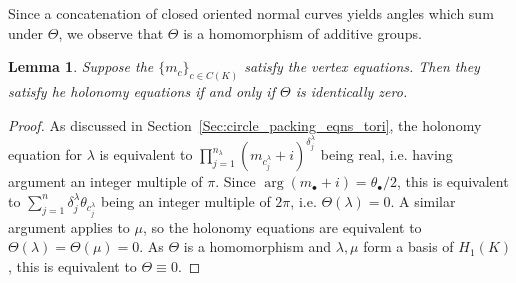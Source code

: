 \documentclass[12pt]{amsart}
\numberwithin{equation}{section}
\newtheorem{lem}[equation]{Lemma}
\theoremstyle{named}
\newcommand{\refsec}[1]{Section~\ref{Sec:#1}}
\begin{document}
Since a concatenation of closed oriented normal curves yields angles which sum under $\Theta$, we observe that $\Theta$ is a homomorphism of additive groups. 

\begin{lem}
\label{Lem:holonomy_Theta_0}
Suppose the $\{m_c\}_{c \in C(K)}$ satisfy the vertex equations. Then they satisfy he holonomy equations if and only if $\Theta$ is identically zero.
\end{lem}

\begin{proof}
As discussed in \refsec{circle_packing_eqns_tori}, the holonomy equation for $\lambda$ is equivalent to $\prod_{j=1}^{n_\lambda} \left( m_{c_j^\lambda} + i \right)^{\delta_j^\lambda}$ being real, i.e. having argument an integer multiple of $\pi$. Since $\arg(m_\bullet + i) = \theta_\bullet/2$, this is equivalent to $\sum_{j=1}^n \delta_j^\lambda \theta_{c_j^\lambda}$ being an integer multiple of $2\pi$, i.e. $\Theta(\lambda) = 0$. A similar argument applies to $\mu$, so the holonomy equations are equivalent to $\Theta(\lambda) = \Theta(\mu) = 0$. As $\Theta$ is a homomorphism and $\lambda, \mu$ form a basis of $H_1 (K)$, this is equivalent to $\Theta \equiv 0$.
\end{proof}
\end{document}

